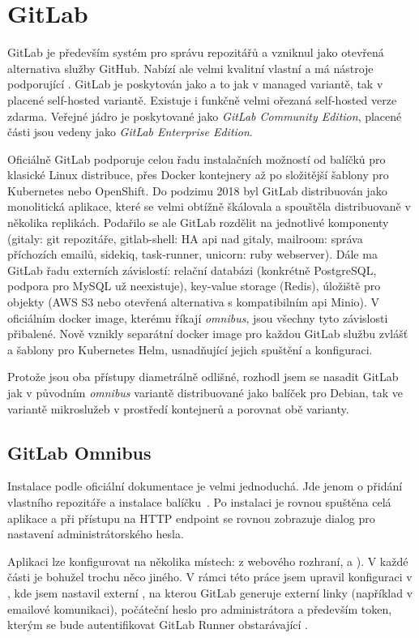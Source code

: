 \section{GitLab}
    \label{sec:gitlab}
    GitLab je především systém pro správu repozitářů a vzniknul jako otevřená alternativa služby GitHub. Nabízí ale velmi kvalitní vlastní \CI a má nástroje podporující \CD. GitLab je poskytován jako  a to jak v managed variantě, tak v placené self-hosted variantě. Existuje i funkčně velmi ořezaná self-hosted verze zdarma. Veřejné jádro je poskytované jako \textit{GitLab Community Edition}, placené části jsou vedeny jako \textit{GitLab Enterprise Edition}.

    Oficiálně GitLab podporuje celou řadu instalačních možností od balíčků pro klasické Linux distribuce, přes Docker kontejnery až po složitější šablony pro Kubernetes nebo OpenShift. Do podzimu 2018 byl GitLab distribuován jako monolitická aplikace, které se velmi obtížně škálovala a spouštěla distribuovaně v několika replikách. Podařilo se ale GitLab rozdělit na jednotlivé komponenty (gitaly: git repozitáře, gitlab-shell: HA api nad gitaly, mailroom: správa příchozích emailů, sidekiq, task-runner, unicorn: ruby webserver). Dále ma GitLab řadu externích závislostí: relační databázi (konkrétně PostgreSQL, podpora pro MySQL už neexistuje), key-value storage (Redis), úložiště pro objekty (AWS S3 nebo otevřená alternativa s kompatibilním api Minio). V oficiálním docker image, kterému říkají \textit{omnibus}, jsou všechny tyto závislosti přibalené. Nově vznikly separátní docker image pro každou GitLab službu zvlášť a šablony pro Kubernetes Helm, usnadňující jejich spuštění a konfiguraci.

    Protože jsou oba přístupy diametrálně odlišné, rozhodl jsem se nasadit GitLab jak v původním \textit{omnibus} variantě distribuované jako balíček pro Debian, tak ve variantě mikroslužeb v prostředí kontejnerů a porovnat obě varianty.

    \subsection{GitLab Omnibus}
        Instalace podle oficiální dokumentace je velmi jednoduchá. Jde jenom o přidání vlastního repozitáře a instalace balíčku~\cite{gitlab-install-ubuntu}. Po instalaci je rovnou spuštěna celá aplikace a při přístupu na HTTP endpoint se rovnou zobrazuje dialog pro nastavení administrátorského hesla.

        Aplikaci lze konfigurovat na několika místech: z webového rozhraní,  a ). V každé části je bohužel trochu něco jiného. V rámci této práce jsem upravil konfiguraci v , kde jsem nastavil externí , na kterou GitLab generuje externí linky (například v emailové komunikaci), počáteční heslo pro administrátora a především token, kterým se bude autentifikovat GitLab Runner obstarávající \CI.

